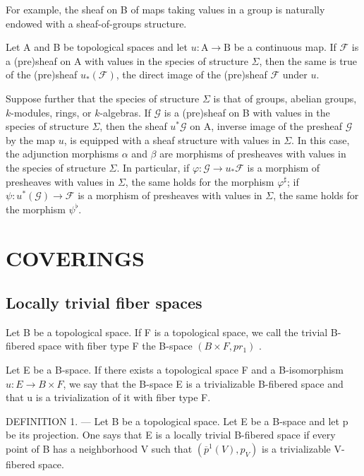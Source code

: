 For example, the sheaf on B of maps taking values in a group is naturally endowed with a sheaf-of-groups structure.

Let A and B be topological spaces and let \(u\colon\mathrm{A}\to\mathrm{B}\) be a continuous map. If \(\mathcal{F}\) is a (pre)sheaf on A with values in the species of structure \(\Sigma\), then the same is true of the (pre)sheaf \(u_{*}(\mathcal{F})\), the direct image of the (pre)sheaf \(\mathcal{F}\) under \(u\).

Suppose further that the species of structure \(\Sigma\) is that of groups, abelian groups, \(k\)-modules, rings, or \(k\)-algebras. If \(\mathcal{G}\) is a (pre)sheaf on B with values in the species of structure \(\Sigma\), then the sheaf \(u^{*}\mathcal{G}\) on A, inverse image of the presheaf \(\mathcal{G}\) by the map \(u\), is equipped with a sheaf structure with values in \(\Sigma\). In this case, the adjunction morphisms \(\alpha\) and \(\beta\) are morphisms of presheaves with values in the species of structure \(\Sigma\). In particular, if \(\varphi: \mathcal{G} \to u_{*}\mathcal{F}\) is a morphism of presheaves with values in \(\Sigma\), the same holds for the morphism \(\varphi^{\sharp}\); if \(\psi: u^{*}(\mathcal{G}) \to \mathcal{F}\) is a morphism of presheaves with values in \(\Sigma\), the same holds for the morphism \(\psi^{\flat}\).

\section{COVERINGS}

\subsection{Locally trivial fiber spaces}

Let B be a topological space. If F is a topological space, we call the trivial B-fibered space with fiber type F the B-space \((B \times F, pr_{1})\) .

Let E be a B-space. If there exists a topological space F and a B-isomorphism \(u: E \rightarrow B \times F\), we say that the B-space E is a trivializable B-fibered space and that u is a trivialization of it with fiber type F.

DEFINITION 1. --- Let B be a topological space. Let E be a B-space and let p be its projection. One says that E is a locally trivial B-fibered space if every point of B has a neighborhood V such that \((\overline{p}^{1}(V), p_{V})\) is a trivializable V-fibered space.

